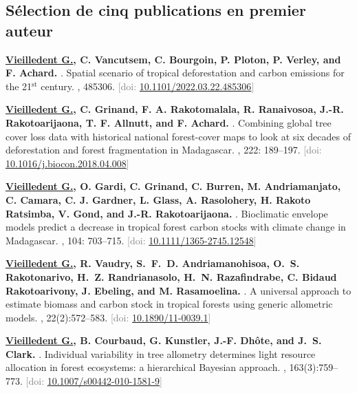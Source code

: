 \documentclass[10pt,a4paper,sans]{moderncv}
\newcounter{enumiv_gv}
\newcommand\doi[1]{[doi: \href{https://doi.org/#1}{#1}]}
\begin{document}
\vspace{0.3cm}
\subsection{Sélection de cinq publications en premier auteur}

\begin{thebibliography}{5}

\setcounter{enumiv}{4}
\textbf{\underline{Vieilledent G.}, C. Vancutsem, C. Bourgoin, P. Ploton, P. Verley, and F. Achard.} 
.
\newblock Spatial scenario of tropical deforestation and carbon emissions for the 21$^{\text{st}}$ century.
, 485306.
\newblock \textcolor{gray}{\doi{10.1101/2022.03.22.485306}}

\setcounter{enumiv}{3}
\textbf{\underline{Vieilledent G.}, C. Grinand, F. A. Rakotomalala, R. Ranaivosoa, J.-R. Rakotoarijaona, T. F. Allnutt, and F. Achard.} 
.
\newblock Combining global tree cover loss data with historical national forest-cover maps to look at six decades of deforestation and forest fragmentation in Madagascar.
, 222: 189--197.
\newblock \textcolor{gray}{\doi{10.1016/j.biocon.2018.04.008}}

\setcounter{enumiv}{2}
\textbf{\underline{Vieilledent G.}, O. Gardi, C. Grinand, C. Burren, M. Andriamanjato, C. Camara, C. J. Gardner, L. Glass, A. Rasolohery, H. Rakoto Ratsimba, V. Gond, and J.-R. Rakotoarijaona.} 
.
\newblock Bioclimatic envelope models predict a decrease in tropical forest carbon stocks with climate change in Madagascar.
, 104: 703--715.
\newblock \textcolor{gray}{\doi{10.1111/1365-2745.12548}}

\setcounter{enumiv}{1}
\textbf{\underline{Vieilledent G.}, R. Vaudry, S.~F.~D. Andriamanohisoa, O.~S. Rakotonarivo, H.~Z.
  Randrianasolo, H.~N. Razafindrabe, C. Bidaud Rakotoarivony, J. Ebeling, and M. Rasamoelina.}
.
\newblock A universal approach to estimate biomass and carbon stock in tropical
  forests using generic allometric models.
, 22(2):572--583.
\newblock \textcolor{gray}{\doi{10.1890/11-0039.1}}

\setcounter{enumiv}{0}
\textbf{\underline{Vieilledent G.}, B. Courbaud, G. Kunstler, J.-F. Dhôte, and J.~S. Clark.}
.
\newblock Individual variability in tree allometry determines light resource
  allocation in forest ecosystems: a hierarchical Bayesian approach.
, 163(3):759--773.
\newblock \textcolor{gray}{\doi{10.1007/s00442-010-1581-9}}

\end{thebibliography}
\end{document}
